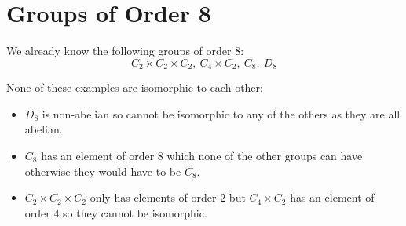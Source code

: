 \documentclass[../main.tex]{subfiles}
\begin{document}
\section{Groups of Order 8}
We already know the following groups of order 8:
\[
  C_2 \times C_2 \times C_2,\ C_4 \times C_2,\ C_8,\ D_8
\]
\begin{remark}
  None of these examples are isomorphic to each other:
  \begin{itemize}
    \item $D_8$ is non-abelian so cannot be isomorphic to any of the others as they are all abelian.
    \item $C_8$ has an element of order 8 which none of the other groups can have otherwise they would have to be $C_8$.
    \item $C_2 \times C_2 \times C_2$ only has elements of order 2 but $C_4 \times C_2$ has an element of order 4 so they cannot be isomorphic.
  \end{itemize}
\end{remark}
\end{document}
